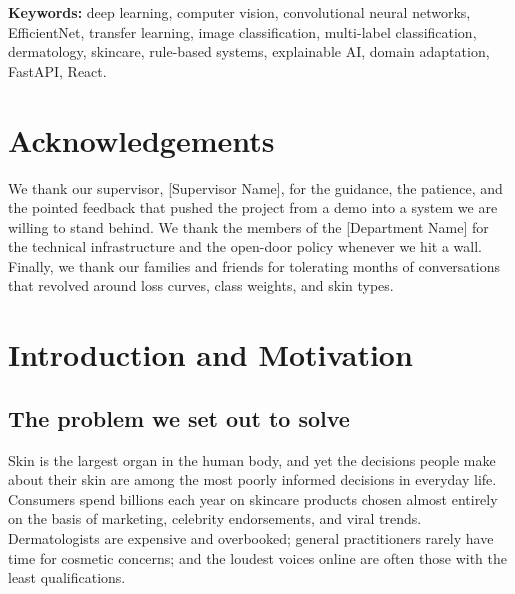 \documentclass[11pt,a4paper,oneside]{report}
\begin{document}
\bigskip
\noindent\textbf{Keywords:} deep learning, computer vision, convolutional
neural networks, EfficientNet, transfer learning, image classification,
multi-label classification, dermatology, skincare, rule-based systems,
explainable AI, domain adaptation, FastAPI, React.

\clearpage

\chapter*{Acknowledgements}

We thank our supervisor, [Supervisor Name], for the guidance, the
patience, and the pointed feedback that pushed the project from a demo
into a system we are willing to stand behind. We thank the members of
the [Department Name] for the technical infrastructure and the open-door
policy whenever we hit a wall. Finally, we thank our families and
friends for tolerating months of conversations that revolved around
loss curves, class weights, and skin types.

\clearpage

\tableofcontents
\clearpage
\listoffigures
{}
\listoftables
{}
\clearpage

\setcounter{page}{1}

\chapter{Introduction and Motivation}\label{ch:intro}

\section{The problem we set out to solve}

Skin is the largest organ in the human body, and yet the decisions
people make about their skin are among the most poorly informed
decisions in everyday life. Consumers spend billions each year on
skincare products chosen almost entirely on the basis of marketing,
celebrity endorsements, and viral trends. Dermatologists are expensive
and overbooked; general practitioners rarely have time for cosmetic
concerns; and the loudest voices online are often those with the
least qualifications.
\end{document}
